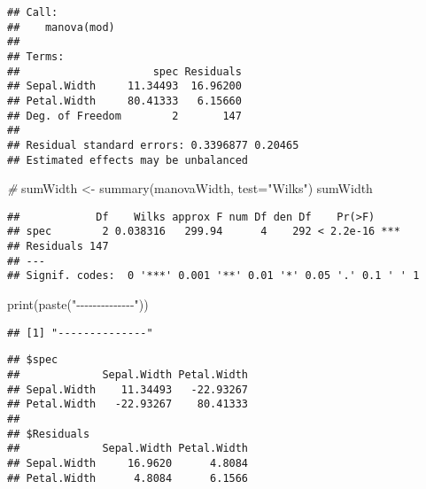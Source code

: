 \documentclass[
]{article}
\newenvironment{Shaded}{\begin{snugshade}}{\end{snugshade}}
\newcommand{\AttributeTok}[1]{\textcolor[rgb]{0.77,0.63,0.00}{#1}}
\newcommand{\CommentTok}[1]{\textcolor[rgb]{0.56,0.35,0.01}{\textit{#1}}}
\newcommand{\FunctionTok}[1]{\textcolor[rgb]{0.00,0.00,0.00}{#1}}
\newcommand{\NormalTok}[1]{#1}
\newcommand{\OtherTok}[1]{\textcolor[rgb]{0.56,0.35,0.01}{#1}}
\newcommand{\SpecialCharTok}[1]{\textcolor[rgb]{0.00,0.00,0.00}{#1}}
\newcommand{\StringTok}[1]{\textcolor[rgb]{0.31,0.60,0.02}{#1}}
\begin{document}
\begin{verbatim}
## Call:
##    manova(mod)
## 
## Terms:
##                     spec Residuals
## Sepal.Width     11.34493  16.96200
## Petal.Width     80.41333   6.15660
## Deg. of Freedom        2       147
## 
## Residual standard errors: 0.3396877 0.20465
## Estimated effects may be unbalanced
\end{verbatim}

\begin{Shaded}
\begin{Highlighting}[]
\CommentTok{\#}
\NormalTok{sumWidth }\OtherTok{\textless{}{-}} \FunctionTok{summary}\NormalTok{(manovaWidth, }\AttributeTok{test=}\StringTok{"Wilks"}\NormalTok{)}
\NormalTok{sumWidth}
\end{Highlighting}
\end{Shaded}

\begin{verbatim}
##            Df    Wilks approx F num Df den Df    Pr(>F)    
## spec        2 0.038316   299.94      4    292 < 2.2e-16 ***
## Residuals 147                                              
## ---
## Signif. codes:  0 '***' 0.001 '**' 0.01 '*' 0.05 '.' 0.1 ' ' 1
\end{verbatim}

\begin{Shaded}
\begin{Highlighting}[]
\FunctionTok{print}\NormalTok{(}\FunctionTok{paste}\NormalTok{(}\StringTok{"{-}{-}{-}{-}{-}{-}{-}{-}{-}{-}{-}{-}{-}{-}"}\NormalTok{))}
\end{Highlighting}
\end{Shaded}

\begin{verbatim}
## [1] "--------------"
\end{verbatim}

\begin{Shaded}
\end{Shaded}

\begin{verbatim}
## $spec
##             Sepal.Width Petal.Width
## Sepal.Width    11.34493   -22.93267
## Petal.Width   -22.93267    80.41333
## 
## $Residuals
##             Sepal.Width Petal.Width
## Sepal.Width     16.9620      4.8084
## Petal.Width      4.8084      6.1566
\end{verbatim}
\end{document}
